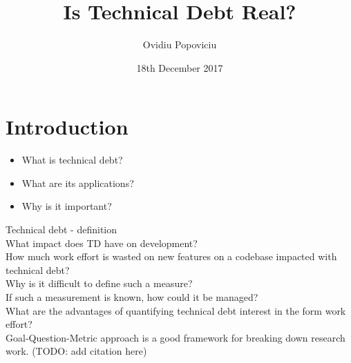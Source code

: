 \documentclass{mprop}
\begin{document}
\title{Is Technical Debt Real?}
\author{Ovidiu Popoviciu}
\date{18th December 2017}
\maketitle

\tableofcontents
\newpage

\section{Introduction}\label{intro}

\begin{itemize}
	\item What is technical debt?
	\item What are its applications?
	\item Why is it important?
\end{itemize}

Technical debt - definition \\
What impact does TD have on development?\\
How much work effort is wasted on new features on a codebase impacted with
technical debt?\\
Why is it difficult to define such a measure? \\
If such a measurement is known, how could it be managed? \\
What are the advantages of quantifying technical debt interest in the form work
effort? \\

Goal-Question-Metric approach is a good framework for breaking down research
work. (TODO: add citation here)
\end{document}
